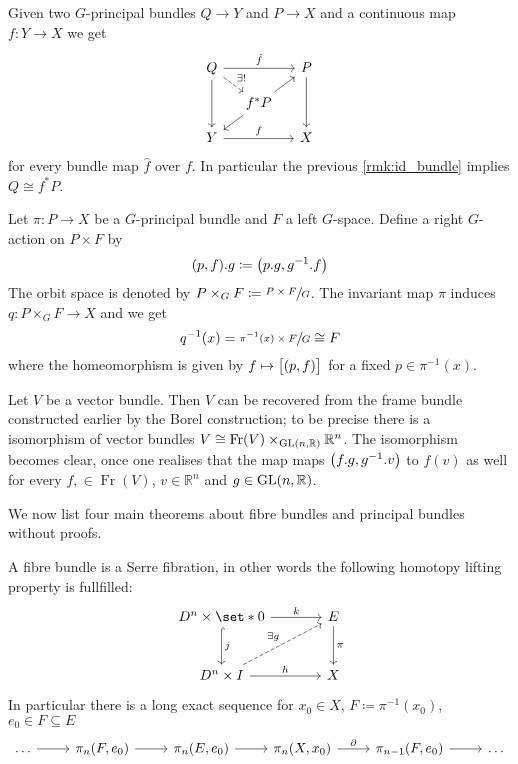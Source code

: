 \begin{remark}
	Given two $G$-principal bundles $Q \to Y$ and $P \to X$ and a continuous map $f \colon Y \to X$ we get 
	\[
		\begin{tikzcd}[sep=small]
			Q \ar[rr,"\hat{f}"]  \ar[dd] \drar[dashed,"\exists!"] & & P \ar[dd] \\
			& f^* P \urar \dlar & \\
			Y \ar[rr,"f"] & & X
		\end{tikzcd}
	\]
	for every bundle map $\hat{f}$ over $f$.
	In particular the previous \autoref{rmk:id_bundle} implies $Q \cong f^* P$.
\end{remark}

\begin{definition}[{name={Borel construction}}]
	Let $\pi \colon P \to X$ be a $G$-principal bundle and $F$ a left $G$-space.
	Define a right $G$-action on $P \times F$ by
	\[
		(p,f) .g \coloneqq \enbrace*{p.g, g^{-1}.f}
	\]
	The orbit space is denoted by $P \times_G F \coloneqq \sfrac{P \times F}{G}$.
	The invariant map $\pi$ induces $q \colon P \times_G F \to X$ and we get
	\[
		q^{-1}(x) = \sfrac{\pi^{-1}(x) \times F}{G} \cong F
	\]
	where the homeomorphism is given by $f \mapsto \benbrace[\big]{(p,f)}$ for a fixed $p \in \pi^{-1}(x)$.
\end{definition}

\begin{example}
	Let $V$ be a vector bundle.
	Then $V$ can be recovered from the frame bundle constructed earlier by the Borel construction; to be precise there is a isomorphism of vector bundles $V \cong \operatorname{Fr}(V) \times_{\GL(n,\mathbb{R})} \mathbb{R}^n$.
	The isomorphism becomes clear, once one realises that the map
	maps $\enbrace*{f.g, g^{-1}. v}$ to $f(v)$ as well for every $f, \in \operatorname{Fr}(V)$, $v \in \mathbb{R}^n$ and $g \in \GL(n,\mathbb{R})$.
\end{example}

We now list four main theorems about fibre bundles and principal bundles without proofs.

\begin{theorem}
	A fibre bundle is a Serre fibration, in other words the following homotopy lifting property is fullfilled:
	\[
		\begin{tikzcd}[sep=large]
			D^n \times \set*{0} \rar["k"]  \dar["j",hook] & E \dar["\pi"] \\
			D^n \times I \urar[dashed,"\exists g"] \rar["h"] & X
		\end{tikzcd}
	\]
	In particular there is a long exact sequence for $x_0 \in X$, $F \coloneqq \pi^{-1}(x_0)$, $e_0 \in F \subseteq E$
	\[
		\begin{tikzcd}
			\ldots \rar & \pi_n(F,e_0) \rar & \pi_n(E,e_0) \rar & \pi_n(X,x_0) \rar["\partial"] & \pi_{n-1}(F,e_0) \rar & \ldots 
		\end{tikzcd}
	\]
\end{theorem}

